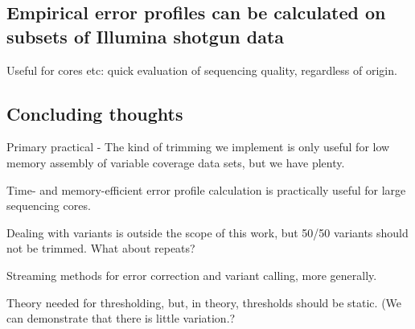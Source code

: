 \documentclass{article}
\begin{document}


\subsection{Empirical error profiles can be calculated on subsets of Illumina shotgun data}

Useful for cores etc: quick evaluation of sequencing quality, regardless
of origin.

\subsection{Concluding thoughts}

Primary practical - The kind of trimming we implement is only useful
for low memory assembly of variable coverage data sets, but we have
plenty.

Time- and memory-efficient error profile calculation is practically useful
for large sequencing cores.

Dealing with variants is outside the scope of this work, but 50/50
variants should not be trimmed.  What about repeats?

Streaming methods for error correction and variant calling, more generally.

Theory needed for thresholding, but, in theory, thresholds should be
static.  (We can demonstrate that there is little variation.?
\end{document}
